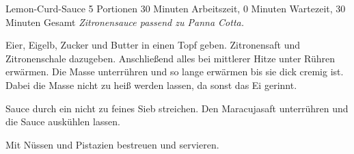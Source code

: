 \begin{recipe}{Lemon-Curd-Sauce} {5 Portionen} {30 Minuten Arbeitszeit, 0 Minuten Wartezeit, 30 Minuten Gesamt}
  \freeform{}\textit{Zitronensauce passend zu Panna Cotta.}


  Eier, Eigelb, Zucker und Butter in einen Topf geben.
  Zitronensaft und Zitronenschale dazugeben.
  Anschließend alles bei mittlerer Hitze unter Rühren erwärmen.
  Die Masse unterrühren und so lange erwärmen bis sie dick cremig ist.
  Dabei die Masse nicht zu heiß werden lassen, da sonst das Ei gerinnt.

  \newstep{}Sauce durch ein nicht zu feines Sieb streichen.
  Den Maracujasaft unterrühren und die Sauce auskühlen lassen.

  \newstep{}Mit Nüssen und Pistazien bestreuen und servieren.

  \freeform{}\hrulefill{}
\end{recipe}
